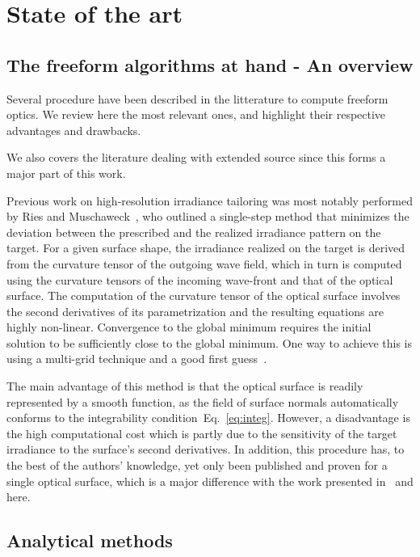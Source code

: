 \chapter{State of the art}
\label{ch:soa}

\section{The freeform algorithms at hand - An overview}
Several procedure have been described in the litterature to compute 
freeform optics. We review here the most relevant ones, and highlight
their respective advantages and drawbacks.

We also covers the literature dealing with extended source since this 
forms a major part of this work.


Previous work on high-resolution irradiance tailoring was most notably
performed by Ries and Muschaweck~\cite{Ries2002}, who outlined a
single-step method that minimizes the deviation between the prescribed
and the realized irradiance pattern on the target. For a given surface
shape, the irradiance realized on the target is derived from the
curvature tensor of the outgoing wave field, which in turn is computed
using the curvature tensors of the incoming wave-front and that of the
optical surface. The computation of the curvature tensor of the
optical surface involves the second derivatives of its parametrization
and the resulting equations are highly non-linear. Convergence to the
global minimum requires the initial solution to be sufficiently close
to the global minimum. One way to achieve this is using a multi-grid
technique and a good first guess~\cite{Baeuerle2010}.

The main advantage of this method is that the optical surface is
readily represented by a smooth function, as the field of surface
normals automatically conforms to the integrability
condition~Eq.~\eqref{eq:integ}. However, a disadvantage is the high
computational cost which is partly due to the sensitivity of the
target irradiance to the surface's second derivatives. In addition,
this procedure has, to the best of the authors' knowledge, yet only
been published and proven for a single optical surface, which is a
major difference with the work presented in~\cite{Baeuerle2012} and
here.



\section{Analytical methods}

